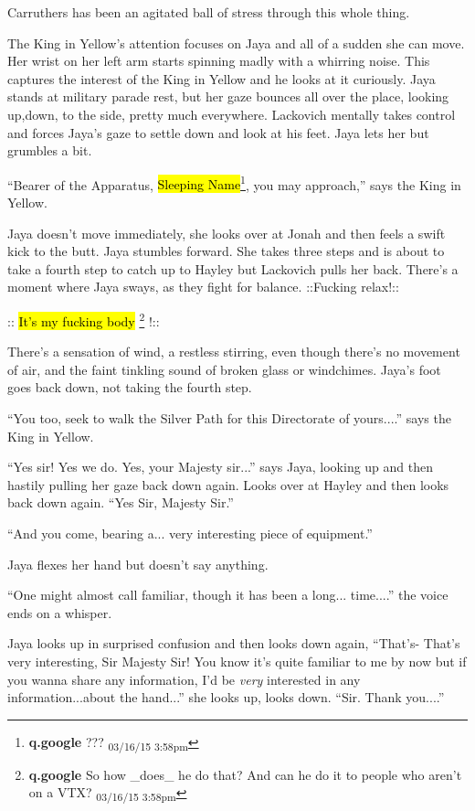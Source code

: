 Carruthers has been an agitated ball of stress through this whole thing.





The King in Yellow's attention focuses on Jaya and all of a sudden she can move.  Her wrist on her left arm starts spinning madly with a whirring noise.  This captures the interest of the King in Yellow and he looks at it curiously.  Jaya stands at military parade rest, but her gaze bounces all over the place, looking up,down, to the side, pretty much everywhere.  Lackovich mentally takes control and forces Jaya's gaze to settle down and look at his feet.  Jaya lets her but grumbles a bit.

``Bearer of the Apparatus, \hl{Sleeping Name}\footnote{\textbf{q.google }??? \textsubscript{03/16/15 3:58pm}}, you may approach,'' says the King in Yellow.

Jaya doesn't move immediately, she looks over at Jonah and then feels a swift kick to the butt.  Jaya stumbles forward.  She takes three steps and is about to take a fourth step to catch up to Hayley but Lackovich pulls her back.  There's a moment where Jaya sways, as they fight for balance.   {\color[RGB]{74,134,232}::Fucking relax!::} 

 {\color[RGB]{255,0,0}::}  {\color[RGB]{255,0,0}\hl{It's my fucking body}} \footnote{\textbf{q.google }So how \_does\_ he do that?  And can he do it to people who aren't on a VTX? \textsubscript{03/16/15 3:58pm}} {\color[RGB]{255,0,0}!::} 

There's a sensation of wind, a restless stirring, even though there's no movement of air, and the faint tinkling sound of broken glass or windchimes.  Jaya's foot goes back down, not taking the fourth step.

``You too, seek to walk the Silver Path for this Directorate of yours....'' says the King in Yellow.

``Yes sir!  Yes we do.  Yes, your Majesty sir...'' says Jaya, looking up and then hastily pulling her gaze back down again.  Looks over at Hayley and then looks back down again. ``Yes Sir, Majesty Sir.''

``And you come, bearing a... very interesting piece of equipment.''

Jaya flexes her hand but doesn't say anything.

``One might almost call familiar, though it has been a long... time....'' the voice ends on a whisper.

Jaya looks up in surprised confusion and then looks down again, ``That's- That's very interesting, Sir Majesty Sir!  You know it's quite familiar to me by now but if you wanna share any information, I'd be \textit{very} interested in any information...about the hand...'' she looks up, looks down. ``Sir. Thank you....''

